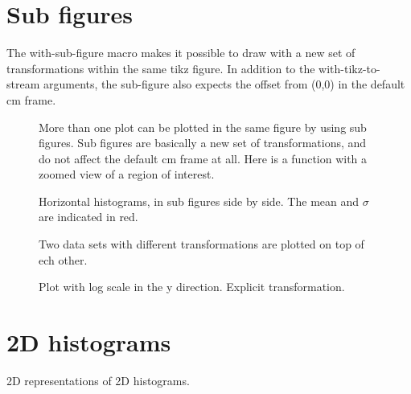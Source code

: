 \documentclass{article}
\begin{document}
\section{Sub figures}


The with-sub-figure macro makes it possible to draw with a new set of transformations
within the same tikz figure. In addition to the with-tikz-to-stream arguments, the sub-figure also
expects the offset from (0,0) in the default cm frame.

\begin{figure}[H]
\centering

\captionsetup{singlelinecheck=off}
\caption[asdf]{More than one plot can be plotted in the same figure by using sub figures.
Sub figures are basically a new set of transformations, and do not affect the default cm frame at all.
Here is a function with a zoomed view of a region of interest.}
\end{figure}
\begin{figure}[H]
\centering

\captionsetup{singlelinecheck=off}
\caption[asdf]{Horizontal histograms, in sub figures side by side. The mean and $\sigma$ are indicated in red.}
\end{figure}
\begin{figure}[H]
\centering

\captionsetup{singlelinecheck=off}
\caption[asdf]{Two data sets with different transformations are plotted on top of ech other.}
\end{figure}
\begin{figure}[H]
\centering

\captionsetup{singlelinecheck=off}
\caption[asdf]{Plot with log scale in the y direction. Explicit transformation.}
\end{figure}
\section{2D histograms}


2D representations of 2D histograms.
\end{document}
